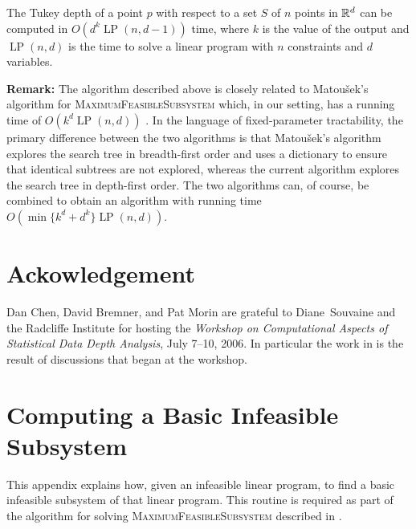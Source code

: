 \documentclass[charterfonts,lotsofwhite]{patmorin}
\DeclareMathOperator{\lp}{LP}
\begin{document}
\begin{thm}
The Tukey depth of a point $p$ with respect to a set $S$ of $n$ points
in $\mathbb{R}^d$ can be computed in $O(d^k\lp(n,d-1))$ time, where $k$ is
the value of the output and $\lp(n,d)$ is the time to solve a linear
program with $n$ constraints and $d$ variables.
\end{thm}

\noindent\textbf{Remark:}
The algorithm described above is closely related to Matou\v{s}ek's
algorithm for \textsc{MaximumFeasibleSubsystem} which, in our setting, 
has a running
time of $O(k^{d}\lp(n,d))$ \cite{m95}.  In the language of fixed-parameter
tractability, the primary difference between the two algorithms is
that Matou\v{s}ek's algorithm explores the search tree in
breadth-first order and uses a dictionary to ensure that identical
subtrees are not explored, whereas the current algorithm explores the
search tree in depth-first order.  The two algorithms can, of course,
be combined to obtain an algorithm with running time $O(\min\{k^d +
d^k\}\lp(n,d))$.


\section*{Ackowledgement}

Dan Chen, David Bremner, and Pat Morin are grateful to Diane~Souvaine
and the Radcliffe Institute for hosting the \emph{Workshop on
Computational Aspects of Statistical Data Depth Analysis}, July 7--10,
2006.  In particular the work in  is the result of
discussions that began at the workshop.




\appendix
\section{Computing a Basic Infeasible Subsystem}

This appendix explains how, given an infeasible linear program, to
find a basic infeasible subsystem of that linear program.  This
routine is required as part of the algorithm for solving
\textsc{MaximumFeasibleSubsystem} described in .
\end{document}
